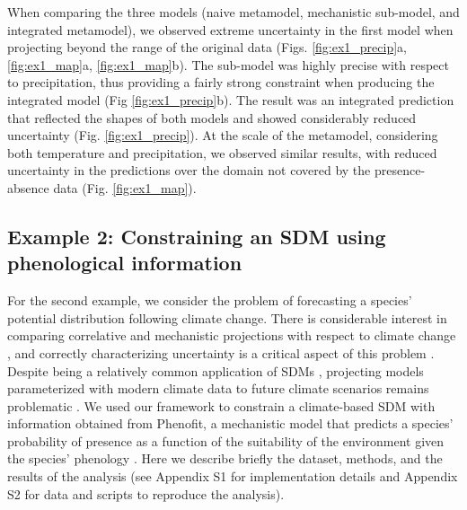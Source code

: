 \documentclass[11pt]{article}
\begin{document}
When comparing the three models (naive metamodel, mechanistic sub-model, and integrated metamodel), we observed extreme uncertainty in the first model when projecting beyond the range of the original data (Figs. \ref{fig:ex1_precip}a, \ref{fig:ex1_map}a, \ref{fig:ex1_map}b).
The sub-model was highly precise with respect to precipitation, thus providing a fairly strong constraint when producing the integrated model (Fig \ref{fig:ex1_precip}b).
The result was an integrated prediction that reflected the shapes of both models and showed considerably reduced uncertainty (Fig. \ref{fig:ex1_precip}).
At the scale of the metamodel, considering both temperature and precipitation, we observed similar results, with reduced uncertainty in the predictions over the domain not covered by the presence-absence data (Fig. \ref{fig:ex1_map}).


%
%


\subsection*{Example 2: Constraining an SDM using phenological information}
For the second example, we consider the problem of forecasting a species' potential distribution following climate change.
There is considerable interest in comparing correlative and mechanistic projections with respect to climate change \citep{Morin2009}, and correctly characterizing uncertainty is a critical aspect of this problem \citep{Cheaib2012}.
Despite being a relatively common application of SDMs \citep{Guisan2005}, projecting models parameterized with modern climate data to future climate scenarios remains problematic \citep{Araujo2006}.
We used our framework to constrain a climate-based SDM with information obtained from Phenofit, a mechanistic model that predicts a species' probability of presence as a function of the suitability of the environment given the species' phenology \citep{Chuine2001, Morin2009}.
Here we describe briefly the dataset, methods, and the results of the analysis (see Appendix S1 for implementation details and Appendix S2 for data and scripts to reproduce the analysis).
\end{document}
